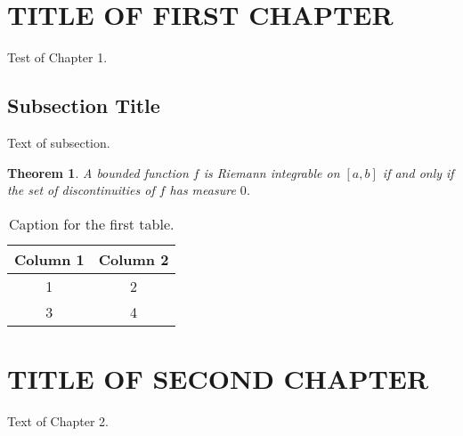 \documentclass[12pt]{etsu_thesis}
\newtheorem{theorem}[fact]{Theorem}
\begin{document}
\listoffigures


\newpage
\section{TITLE OF FIRST CHAPTER}
Test of Chapter 1.

\subsection{Subsection Title}
Text of subsection.

\begin{theorem}
{{\rm \cite{kirkwood}} A bounded function $f$ is Riemann integrable on $[a,b]$ if and only if the set of discontinuities of $f$ has measure $0$.}
\end{theorem}


\begin{table}[h]
\caption{\label{tabletitle1} Caption for the first table.}
\begin{center}
\begin{tabular}{|c|c|}\hline\hline
Column 1 & Column 2 \\ \hline\hline
1 & 2 \\ \hline
3 & 4 \\ \hline\hline
\end{tabular}
\end{center}
\end{table}


\newpage
\clearpage
\section{TITLE OF SECOND CHAPTER}

Text of Chapter 2.
\end{document}
